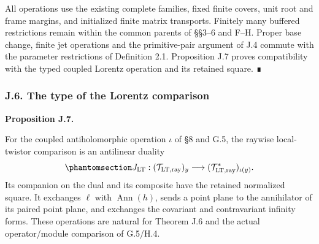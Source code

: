\documentclass[
  english,
  11pt,
  reqno]{amsart}
\makeatletter
\newcommand{\pandocstatementheading}[1]{%
  \par\addpenalty{\@beginparpenalty}%
  \addvspace{.5\baselineskip plus .2\baselineskip minus .2\baselineskip}%
  {\normalfont\bfseries #1\par}%
  \nobreak\@afterindenttrue\@afterheading
}
\makeatother
\begin{document}
All operations use the existing complete families, fixed finite covers,
unit root and frame margins, and initialized finite matrix transports.
Finitely many buffered restrictions remain within the common parents of
§§3--6 and F--H. Proper base change, finite jet operations and the
primitive-pair argument of J.4 commute with the parameter restrictions
of Definition 2.1. Proposition J.7 proves compatibility with the typed
coupled Lorentz operation and its retained square. ∎

\protect{}\label{sec:gg-ward-lorentz-duality}

\subsubsection{J.6. The type of the Lorentz
comparison}\label{j.6.-the-type-of-the-lorentz-comparison}

\pandocstatementheading{\protect{}\label{prop:gg-ward-lorentz-duality}Proposition J.7.}

For the coupled antiholomorphic operation \(\iota\) of §8 and G.5, the
raywise local-twistor comparison is an antilinear duality
\begin{equation}\protect\phantomsection\label{eq:gg-typed-ward-lorentz-duality}{
 J_{\mathrm{LT}}:(\mathcal T_{\mathrm{LT,ray}})_y\longrightarrow (\mathcal T_{\mathrm{LT,ray}}^*)_{\iota(y)}.
}\end{equation} Its companion on the dual and its composite have the
retained normalized square. It exchanges \(\ell\) with
\(\operatorname{Ann}(h)\), sends a point plane to the annihilator of its
paired point plane, and exchanges the covariant and contravariant
infinity forms. These operations are natural for Theorem J.6 and the
actual operator/module comparison of G.5/H.4.
\end{document}
